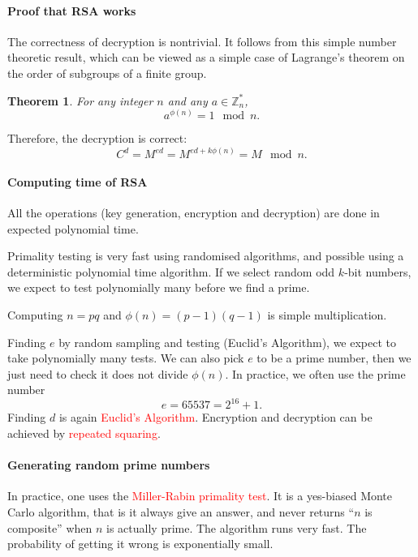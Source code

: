 \documentclass[a4paper, 11pt, openany]{book}
\numberwithin{equation}{section}
\theoremstyle{plain}
\newtheorem{theorem}	[equation]	{Theorem}
\theoremstyle{definition}
\newcommand{\Z}{\mathbb{Z}}
\newcommand{\Important}[1]{\textcolor{red}{#1}}
\begin{document}
\paragraph{Proof that RSA works}
The correctness of decryption is nontrivial. It follows from this simple number theoretic result, which can be viewed as a simple case of Lagrange's theorem on the order of subgroups of a finite group.

\begin{theorem}
For any integer $n$ and any $a \in \Z_n^*$,
\[
    a^{\phi(n)} = 1 \mod n.
\]
\end{theorem}
Therefore, the decryption is correct:
\[
    C^d = M^{ed} = M^{ed + k \phi(n)} = M \mod n.
\]


\paragraph{Computing time of RSA}
All the operations (key generation, encryption and decryption) are done in expected polynomial time.

Primality testing is very fast using randomised algorithms, and possible using a deterministic polynomial time algorithm. If we select random odd $k$-bit numbers, we expect to test polynomially many before we find a prime.

Computing $n = pq$ and $\phi(n) = (p-1)(q-1)$ is simple multiplication.

Finding $e$ by random sampling and testing (Euclid’s Algorithm), we expect to take polynomially many tests. We can also pick $e$ to be a prime number, then we just need to check it does not divide $\phi(n)$. In practice, we often use the prime number
\[
    e = 65537 = 2^{16}+1.
\]
Finding $d$ is again \Important{Euclid’s Algorithm}. Encryption and decryption can be achieved by \Important{repeated squaring}.



\paragraph{Generating random prime numbers}
In practice, one uses the \Important{Miller-Rabin primality test}. It is a yes-biased Monte Carlo algorithm, that is it always give an answer, and never returns ``$n$ is composite'' when $n$ is actually prime. The algorithm runs very fast. The probability of getting it wrong is exponentially small. 
\end{document}
